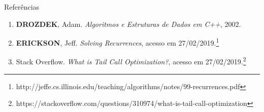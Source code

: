 \begin{frame}[fragile]{Referências}

    \begin{enumerate}
        \item \textbf{DROZDEK}, Adam. \textit{Algoritmos e Estruturas de Dados em C++}, 2002.

        \item \textbf{ERICKSON}, Jeff. \textit{Solving Recurrences}, acesso em 27/02/2019.\footnote{http://jeffe.cs.illinois.edu/teaching/algorithms/notes/99-recurrences.pdf}

        \item Stack Overflow. \textit{What is Tail Call Optimization?}, acesso em 27/02/2019.\footnote{https://stackoverflow.com/questions/310974/what-is-tail-call-optimization}

    \end{enumerate}

\end{frame}
